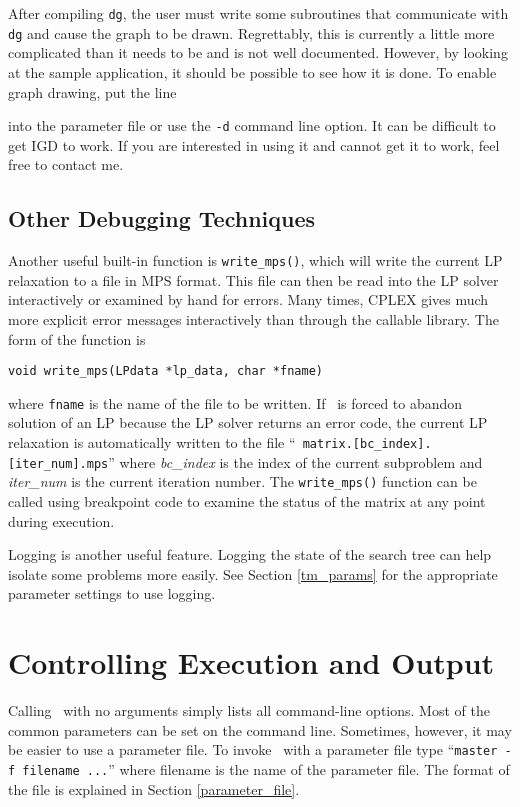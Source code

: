 After compiling {\tt dg}, the user must write some subroutines that
communicate with {\tt dg} and cause the graph to be drawn.
Regrettably, this is currently a little more complicated than it needs
to be and is not well documented. However, by looking at the sample
application, it should be possible to see how it is done. To
enable graph drawing, put the line { into the
parameter file or use the {\tt -d} command line option. It can be difficult to
get IGD to work. If you are interested in using it and cannot get it to work,
feel free to contact me.

\subsection{Other Debugging Techniques}

Another useful built-in function is \texttt{write\_mps()}, which will write the
current LP relaxation to a file in MPS format. This file can then be read into
the LP solver interactively or examined by hand for errors.  Many times, CPLEX
gives much more explicit error messages interactively than through the
callable library. The form of the function is
\begin{verbatim}
void write_mps(LPdata *lp_data, char *fname)
\end{verbatim}
where \texttt{fname} is the name of the file to be written. If \BB\ is forced
to abandon solution of an LP because the LP solver returns an error code, the
current LP relaxation is automatically written to the file ``{\tt
matrix.[bc\_index].[iter\_num].mps}'' where {\em bc\_index} is the index of
the current subproblem and {\em iter\_num} is the current iteration
number. The \texttt{write\_mps()} function can be called using breakpoint code
to examine the status of the matrix at any point during execution.

Logging is another useful feature. Logging the state of the search tree can
help isolate some problems more easily. See Section \ref{tm_params}
for the appropriate parameter settings to use logging.

\section{Controlling Execution and Output}
\label{output}
Calling \BB\ with no arguments simply lists all command-line options.  Most of
the common parameters can be set on the command line. Sometimes, however, it
may be easier to use a parameter file. To invoke \BB\ with a parameter file
type ``{\tt master -f filename ...}'' where filename is the name of the
parameter file. The format of the file is explained in Section
\ref{parameter_file}. 

}
